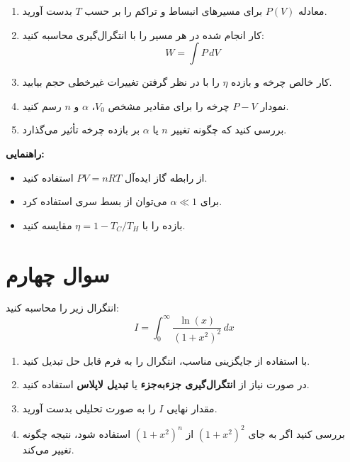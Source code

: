 \documentclass[a4paper,16pt]{article}
\begin{document}
	\begin{enumerate}
		\item معادله $P(V)$ برای مسیرهای انبساط و تراکم را بر حسب $T$ بدست آورید.
		
		\item کار انجام شده در هر مسیر را با انتگرال‌گیری محاسبه کنید:
		\[
		W = \int P\, dV
		\]
		
		\item کار خالص چرخه و بازده $\eta$ را با در نظر گرفتن تغییرات غیرخطی حجم بیابید.
		
		\item نمودار $P\!-\!V$ چرخه را برای مقادیر مشخص $V_0$، $\alpha$ و $n$ رسم کنید.
		
		\item بررسی کنید که چگونه تغییر $n$ یا $\alpha$ بر بازده چرخه تأثیر می‌گذارد.
	\end{enumerate}
	
	\textbf{راهنمایی:}
	\begin{itemize}
		\item از رابطه گاز ایده‌آل $PV = nRT$ استفاده کنید.
		\item برای $\alpha \ll 1$ می‌توان از بسط سری استفاده کرد.
		\item بازده را با $\eta = 1 - T_C/T_H$ مقایسه کنید.
	\end{itemize}
	
	
	\section{سوال چهارم}
	
	انتگرال زیر را محاسبه کنید:
	\[
	I = \int_0^\infty \frac{\ln(x)}{(1+x^2)^2}\, dx
	\]
	
	\begin{enumerate}
		\item با استفاده از جایگزینی مناسب، انتگرال را به فرم قابل حل تبدیل کنید.
		
		\item در صورت نیاز از \textbf{انتگرال‌گیری جزء‌به‌جزء} یا \textbf{تبدیل لاپلاس} استفاده کنید.
		
		\item مقدار نهایی $I$ را به صورت تحلیلی بدست آورید.
		
		\item بررسی کنید اگر به جای $(1+x^2)^2$ از $(1+x^2)^n$ استفاده شود، نتیجه چگونه تغییر می‌کند.
	\end{enumerate}
	
\end{document}
